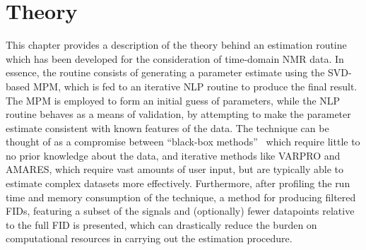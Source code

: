 \chapter{Theory}
\label{chap:theory}

This chapter provides a description of the theory behind an estimation
routine which has been developed for the consideration of time-domain \ac{NMR}
data.
In essence, the routine consists of generating a parameter estimate using the
\ac{SVD}-based \ac{MPM}, which is fed to an iterative \ac{NLP} routine to
produce the final result. The \ac{MPM} is employed to form an initial
guess of parameters, while the \ac{NLP} routine behaves as a means of validation,
by attempting to make the parameter estimate consistent with
known features of the data. The technique can be thought of as a compromise
between ``black-box methods''~\cite{Poullet2008} which require little to no
prior knowledge about the data, and iterative methods like \ac{VARPRO} and
\ac{AMARES}, which require vast amounts of user input, but are typically
able to estimate complex datasets more effectively.
Furthermore, after profiling the run time and memory consumption of the
technique, a method for producing filtered \acp{FID}, featuring a subset of the
signals and (optionally) fewer datapoints relative to the full \ac{FID} is
presented, which can drastically reduce the burden on computational resources
in carrying out the estimation procedure.







